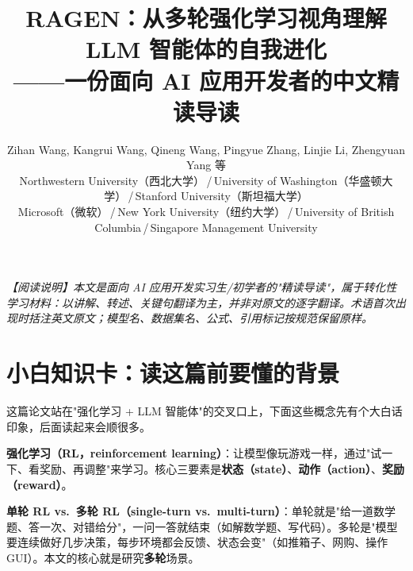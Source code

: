 \documentclass[11pt,UTF8,fontset=fandol]{ctexart}
\title{\textbf{RAGEN：从多轮强化学习视角理解 LLM 智能体的自我进化\\——一份面向 AI 应用开发者的中文精读导读}}
\author{Zihan Wang, Kangrui Wang, Qineng Wang, Pingyue Zhang, Linjie Li, Zhengyuan Yang 等\\
\small Northwestern University（西北大学）\,/\,University of Washington（华盛顿大学）\,/\,Stanford University（斯坦福大学）\\
\small Microsoft（微软）\,/\,New York University（纽约大学）\,/\,University of British Columbia\,/\,Singapore Management University}
\date{}
\begin{document}
\maketitle

\begin{center}
\end{center}

\begin{center}
\small\textit{【阅读说明】本文是面向 AI 应用开发实习生/初学者的"精读导读"，属于转化性学习材料：以讲解、转述、关键句翻译为主，并非对原文的逐字翻译。术语首次出现时括注英文原文；模型名、数据集名、公式、引用标记按规范保留原样。}
\end{center}

\section{小白知识卡：读这篇前要懂的背景}

这篇论文站在"强化学习 + LLM 智能体"的交叉口上，下面这些概念先有个大白话印象，后面读起来会顺很多。

\begin{cardbox}
\textbf{强化学习（RL，reinforcement learning）}：让模型像玩游戏一样，通过"试一下、看奖励、再调整"来学习。核心三要素是\textbf{状态（state）}、\textbf{动作（action）}、\textbf{奖励（reward）}。
\end{cardbox}

\begin{cardbox}
\textbf{单轮 RL vs.\ 多轮 RL（single-turn vs.\ multi-turn）}：单轮就是"给一道数学题、答一次、对错给分"，一问一答就结束（如解数学题、写代码）。多轮是"模型要连续做好几步决策，每步环境都会反馈、状态会变"（如推箱子、网购、操作 GUI）。本文的核心就是研究\textbf{多轮}场景。
\end{cardbox}
\end{document}

